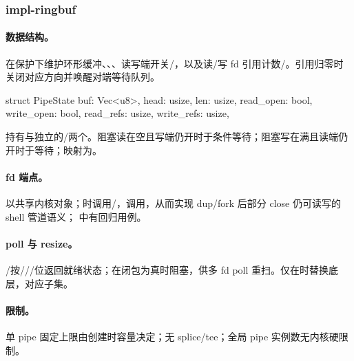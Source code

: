 
\subsubsection{impl-ringbuf}

\paragraph{数据结构。}
在保护下维护环形缓冲、、、读写端开关/，以及读/写 fd 引用计数/。引用归零时关闭对应方向并唤醒对端等待队列。

\begin{rustcode}
struct PipeState {
    buf: Vec<u8>,
    head: usize,
    len: usize,
    read_open: bool,
    write_open: bool,
    read_refs: usize,
    write_refs: usize,
}
\end{rustcode}

持有与独立的/两个。阻塞读在空且写端仍开时于条件等待；阻塞写在满且读端仍开时于等待；映射为。

\paragraph{fd 端点。}
以共享内核对象；时调用/，调用，从而实现 dup/fork 后部分 close 仍可读写的 shell 管道语义； 中有回归用例。

\paragraph{poll 与 resize。}
/按///位返回就绪状态；在闭包为真时阻塞，供多 fd poll 重扫。仅在时替换底层，对应子集。

\paragraph{限制。}
单 pipe 固定上限由创建时容量决定；无 splice/tee；全局 pipe 实例数无内核硬限制。
